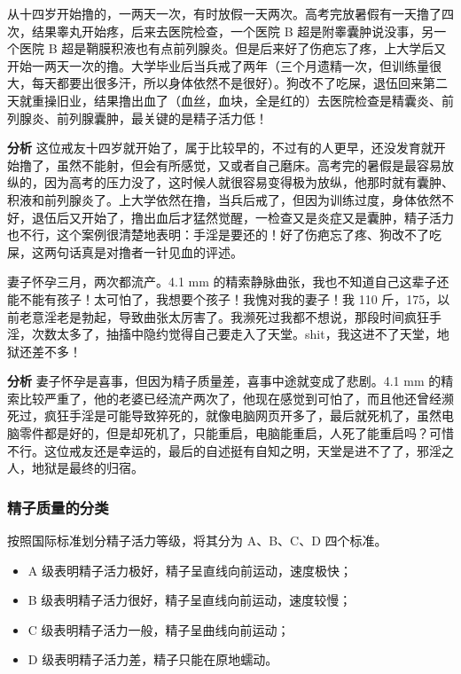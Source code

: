 \begin{case}[不孕不育]
    从十四岁开始撸的，一两天一次，有时放假一天两次。高考完放暑假有一天撸了四次，结果睾丸开始疼，后来去医院检查，一个医院 B 超是附睾囊肿说没事，另一个医院 B 超是鞘膜积液也有点前列腺炎。但是后来好了伤疤忘了疼，上大学后又开始一两天一次的撸。大学毕业后当兵戒了两年（三个月遗精一次，但训练量很大，每天都要出很多汗，所以身体依然不是很好）。狗改不了吃屎，退伍回来第二天就重操旧业，结果撸出血了（血丝，血块，全是红的）去医院检查是精囊炎、前列腺炎、前列腺囊肿，最关键的是精子活力低！

    \textbf{分析} 这位戒友十四岁就开始了，属于比较早的，不过有的人更早，还没发育就开始撸了，虽然不能射，但会有所感觉，又或者自己磨床。高考完的暑假是最容易放纵的，因为高考的压力没了，这时候人就很容易变得极为放纵，他那时就有囊肿、积液和前列腺炎了。上大学依然在撸，当兵后戒了，但因为训练过度，身体依然不好，退伍后又开始了，撸出血后才猛然觉醒，一检查又是炎症又是囊肿，精子活力也不行，这个案例很清楚地表明：手淫是要还的！好了伤疤忘了疼、狗改不了吃屎，这两句话真是对撸者一针见血的评述。
\end{case}

\begin{case}[不孕不育]
    妻子怀孕三月，两次都流产。4.1 \unit{\mm} 的精索静脉曲张，我也不知道自己这辈子还能不能有孩子！太可怕了，我想要个孩子！我愧对我的妻子！我 110 斤，175，以前老意淫老是勃起，导致曲张太厉害了。我濒死过我都不想说，那段时间疯狂手淫，次数太多了，抽搐中隐约觉得自己要走入了天堂。shit，我这进不了天堂，地狱还差不多！

    \textbf{分析} 妻子怀孕是喜事，但因为精子质量差，喜事中途就变成了悲剧。4.1 \unit{\mm} 的精索比较严重了，他的老婆已经流产两次了，他现在感觉到可怕了，而且他还曾经濒死过，疯狂手淫是可能导致猝死的，就像电脑网页开多了，最后就死机了，虽然电脑零件都是好的，但是却死机了，只能重启，电脑能重启，人死了能重启吗？可惜不行。这位戒友还是幸运的，最后的自述挺有自知之明，天堂是进不了了，邪淫之人，地狱是最终的归宿。
\end{case}

\subsubsection{精子质量的分类}

按照国际标准划分精子活力等级，将其分为 A、B、C、D 四个标准。

\begin{itemize}
    \item A 级表明精子活力极好，精子呈直线向前运动，速度极快；
    \item B 级表明精子活力很好，精子呈直线向前运动，速度较慢；
    \item C 级表明精子活力一般，精子呈曲线向前运动；
    \item D 级表明精子活力差，精子只能在原地蠕动。
\end{itemize}

